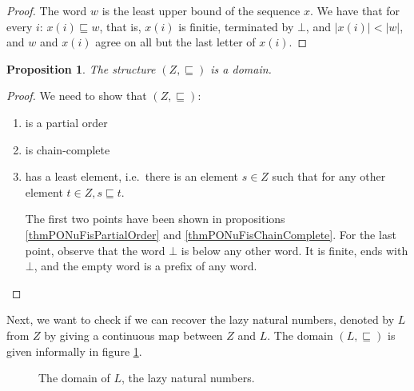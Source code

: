 \documentclass[a4paper]{article}
\newtheorem{thmPONuFisADomain}[defNuF]{Proposition}
\begin{document}
\begin{proof}
The word $w$ is the least upper bound of the sequence $x$. We have that for
every $i$: $x(i) \sqsubseteq w$, that is, $x(i)$ is finitie, terminated by
$\bot$, and $|x(i)| < |w|$, and $w$ and $x(i)$ agree on all but the last letter
of $x(i)$.

\end{proof}


\begin{thmPONuFisADomain}

The structure $(Z, \sqsubseteq)$ is a domain.

\end{thmPONuFisADomain}

\begin{proof}

We need to show that $(Z, \sqsubseteq)$:

\begin{enumerate}

  \item is a partial order

  \item is chain-complete

  \item has a least element, i.e.~there is an element $s \in Z$ such that for
    any other element $t \in Z, s \sqsubseteq t$.

The first two points have been shown in propositions
\ref{thmPONuFisPartialOrder} and \ref{thmPONuFisChainComplete}.  For the last
point, observe that the word $\bot$ is below any other word.  It is finite, ends
with $\bot$, and the empty word is a prefix of any word.

\end{enumerate}

\end{proof}

Next, we want to check if we can recover the lazy natural numbers, denoted by
$L$ from $Z$ by giving a continuous map between $Z$ and $L$.  The domain $(L,
\sqsubseteq)$ is given informally in figure \ref{figDomainOfLazyNaturals}.

\begin{figure}
\begin{center}
\end{center}
\caption{The domain of $L$, the lazy natural numbers.}
\label{figDomainOfLazyNaturals}
\end{figure}
\end{document}
